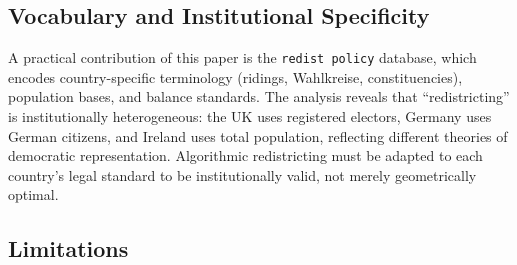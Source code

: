 \subsection{Vocabulary and Institutional Specificity}

A practical contribution of this paper is the \texttt{redist policy} database, which encodes country-specific terminology (ridings, Wahlkreise, constituencies), population bases, and balance standards. The analysis reveals that ``redistricting'' is institutionally heterogeneous: the UK uses registered electors, Germany uses German citizens, and Ireland uses total population, reflecting different theories of democratic representation. Algorithmic redistricting must be adapted to each country's legal standard to be institutionally valid, not merely geometrically optimal.

\subsection{Limitations}

